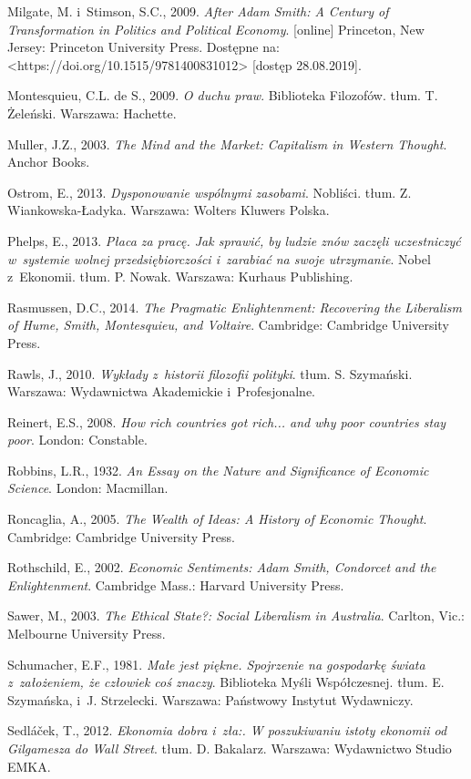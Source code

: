 Milgate, M. i~Stimson, S.C., 2009. \textit{After Adam Smith: A Century of Transformation in Politics and Political Economy}. [online] Princeton, New Jersey: Princeton University Press. Dostępne na: {\textless}https://doi.org/10.1515/9781400831012{\textgreater} [dostęp 28.08.2019].

Montesquieu, C.L. de S., 2009. \textit{O duchu praw}. Biblioteka Filozofów. tłum. T. Żeleński. Warszawa: Hachette.

Muller, J.Z., 2003. \textit{The Mind and the Market: Capitalism in Western Thought}. Anchor Books.

Ostrom, E., 2013. \textit{Dysponowanie wspólnymi zasobami}. Nobliści. tłum. Z. Wiankowska-Ładyka. Warszawa: Wolters Kluwers Polska.

Phelps, E., 2013. \textit{Płaca za pracę. Jak sprawić, by ludzie znów zaczęli uczestniczyć w~systemie wolnej przedsiębiorczości i~zarabiać na swoje utrzymanie}. Nobel z~Ekonomii. tłum. P. Nowak. Warszawa: Kurhaus Publishing.

Rasmussen, D.C., 2014. \textit{The Pragmatic Enlightenment: Recovering the Liberalism of Hume, Smith, Montesquieu, and Voltaire}. Cambridge: Cambridge University Press.

Rawls, J., 2010. \textit{Wykłady z~historii filozofii polityki}. tłum. S. Szymański. Warszawa: Wydawnictwa Akademickie i~Profesjonalne.

Reinert, E.S., 2008. \textit{How rich countries got rich... and why poor countries stay poor}. London: Constable.

Robbins, L.R., 1932. \textit{An Essay on the Nature and Significance of Economic Science}. London: Macmillan.

Roncaglia, A., 2005. \textit{The Wealth of Ideas: A History of Economic Thought}. Cambridge: Cambridge University Press.

Rothschild, E., 2002. \textit{Economic Sentiments: Adam Smith, Condorcet and the Enlightenment}. Cambridge Mass.: Harvard University Press.

Sawer, M., 2003. \textit{The Ethical State?: Social Liberalism in Australia}. Carlton, Vic.: Melbourne University Press.

Schumacher, E.F., 1981. \textit{Małe jest piękne. Spojrzenie na gospodarkę świata z~założeniem, że człowiek coś znaczy}. Biblioteka Myśli Współczesnej. tłum. E. Szymańska, i~J. Strzelecki. Warszawa: Państwowy Instytut Wydawniczy.

Sedláček, T., 2012. \textit{Ekonomia dobra i~zła:. W poszukiwaniu istoty ekonomii od Gilgamesza do Wall Street}. tłum. D. Bakalarz. Warszawa: Wydawnictwo Studio EMKA.

